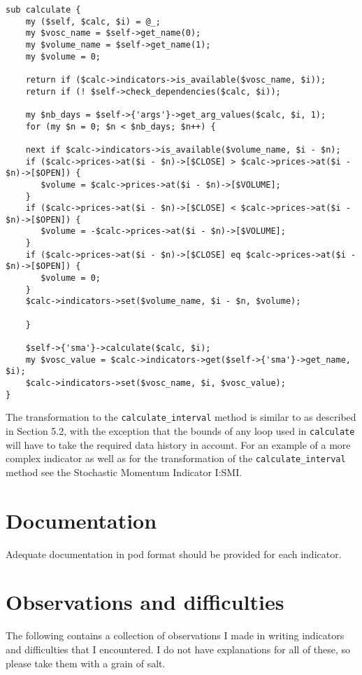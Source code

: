 \documentclass[11pt,twoside]{article}
\begin{document}
\begin{lstlisting}[numbers=none]
sub calculate {
    my ($self, $calc, $i) = @_;
    my $vosc_name = $self->get_name(0);
    my $volume_name = $self->get_name(1);
    my $volume = 0;

    return if ($calc->indicators->is_available($vosc_name, $i));
    return if (! $self->check_dependencies($calc, $i));

    my $nb_days = $self->{'args'}->get_arg_values($calc, $i, 1);
    for (my $n = 0; $n < $nb_days; $n++) {

    next if $calc->indicators->is_available($volume_name, $i - $n);
    if ($calc->prices->at($i - $n)->[$CLOSE] > $calc->prices->at($i - $n)->[$OPEN]) {
       $volume = $calc->prices->at($i - $n)->[$VOLUME];
    }
    if ($calc->prices->at($i - $n)->[$CLOSE] < $calc->prices->at($i - $n)->[$OPEN]) {
       $volume = -$calc->prices->at($i - $n)->[$VOLUME];
    }
    if ($calc->prices->at($i - $n)->[$CLOSE] eq $calc->prices->at($i - $n)->[$OPEN]) {
       $volume = 0;
    }
    $calc->indicators->set($volume_name, $i - $n, $volume);

    }

    $self->{'sma'}->calculate($calc, $i);
    my $vosc_value = $calc->indicators->get($self->{'sma'}->get_name, $i);
    $calc->indicators->set($vosc_name, $i, $vosc_value);
}
\end{lstlisting}
The transformation to the \lstinline!calculate_interval! method
is similar to as described in Section 5.2, with the exception that the
bounds of any loop used in \lstinline!calculate! will have to
take the required data history in account. For an example of a more
complex indicator as well as for the transformation of the
\lstinline!calculate_interval! method see the Stochastic
Momentum Indicator I:SMI.

\section{Documentation}
Adequate documentation in pod format should be provided for each
indicator.

\section{Observations and difficulties}
The following contains a collection of observations I made in writing 
indicators and difficulties that I encountered. I do not have explanations
for all of these, so please take them with a grain of salt.
\end{document}

